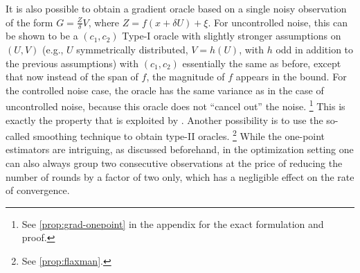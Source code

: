 It is also possible to obtain a gradient oracle based on a single noisy observation
of the form $G = \frac{Z}{\delta}V$, where $Z = f(x+\delta U) + \xi$. 
For uncontrolled noise, this can be shown to be a $(c_1,c_2)$ Type-I oracle with slightly stronger assumptions on $(U,V)$ (e.g., $U$ symmetrically distributed, $V = h(U)$, with $h$ odd in addition to the previous assumptions)
with $(c_1,c_2)$ essentially the same as before, except that now instead of the span of $f$, the magnitude of $f$ appears in the bound. For the controlled noise case, the oracle has the same variance as in the case of uncontrolled noise, because this oracle does not ``cancel out'' the noise.%
\footnote{See \cref{prop:grad-onepoint} in the appendix for the exact formulation and proof.} 
This is exactly the property that is exploited by \cite{duchi2015optimal}.
Another possibility is to use the so-called smoothing technique to obtain type-II oracles.
\footnote{See \cref{prop:flaxman}.} 
While the one-point estimators are intriguing, as discussed beforehand, 
in the optimization setting one can also always group two consecutive observations
at the price of reducing the number of rounds by a factor of two only, which has a negligible effect on the rate of convergence.


